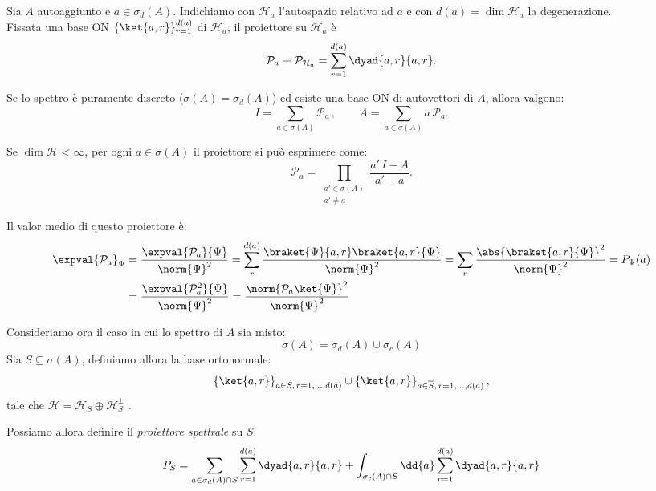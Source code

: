 Sia \(A\) autoaggiunto e \(a\in \sigma_d(A)\). Indichiamo con \(\mathcal{H}_a\) l'autospazio relativo ad \(a\) e con \(d(a)= \dim \mathcal{H}_a\) la degenerazione. \\
Fissata una base ON \(\{\ket{a,r}\}_{r=1}^{d(a)}\) di \(\mathcal{H}_a\), il proiettore su \(\mathcal{H}_a\) è
\begin{equation}
    \mathcal{P}_a \equiv \mathcal{P}_{\mathcal{H}_a}= \sum_{r=1}^{d(a)} \dyad{a,r}{a,r}.
\end{equation}
    

Se lo spettro è puramente discreto (\(\sigma(A)= \sigma_d(A)\)) ed esiste una base ON di autovettori di \(A\), allora valgono:
\begin{equation}
    I= \sum_{a\in \sigma(A)} \mathcal{P}_a\,,\qquad
        A= \sum_{a\in \sigma(A)} a\,\mathcal{P}_a.
\end{equation}

Se \(\dim \mathcal{H} < \infty\), per ogni \(a\in \sigma(A)\) il proiettore si può esprimere come:
\[
    \mathcal{P}_a= \prod_{\substack{a'\in \sigma(A)\\ a'\neq a}} \frac{a'\,I- A}{a'-a}.
\]



Il valor medio di questo proiettore è:
\begin{align}
    \expval{\mathcal{P}_a}_\Psi &= \frac{\expval{\mathcal{P}_a}{\Psi}}{\norm{\Psi}^2}= \sum_r^{d(a)} \frac{\braket{\Psi}{a,r}\braket{a,r}{\Psi}}{\norm{\Psi}^2} =
    \sum_r  \frac{\abs{\braket{a,r}{\Psi}}^2}{\norm{\Psi}^2}= P_\Psi(a)\\
    &= \frac{\expval{\mathcal{P}^2_a}{\Psi}}{\norm{\Psi}^2}= \frac {\norm{\mathcal{P}_a\ket{\Psi}}^2}{\norm{\Psi}^2}
\end{align}

Consideriamo ora il caso in cui lo spettro di \(A\) sia misto:
\[
\sigma(A) = \sigma_d(A) \cup \sigma_c(A)
\]
Sia \( S \subseteq \sigma(A) \), definiamo allora la base ortonormale:
\[
\left\{ \ket{a,r} \right\}_{a \in S,\, r=1,\dots,d(a)} \cup 
\left\{ \ket{a,r} \right\}_{a \in \overline{S},\, r=1,\dots,d(a)} ,
\]
tale che \(\mathcal{H} = \mathcal{H}_S \oplus \mathcal{H}_S^{\perp}\) .

Possiamo allora definire il \textit{proiettore spettrale} su \(S\):
\begin{equation}
    P_S = \sum_{a \in \sigma_d(A) \cap S} \sum_{r=1}^{d(a)} \dyad{a,r}{a,r} 
    + \int_{\sigma_c(A) \cap S} \dd{a} \sum_{r=1}^{d(a)} \dyad{a,r}{a,r}
\end{equation}

